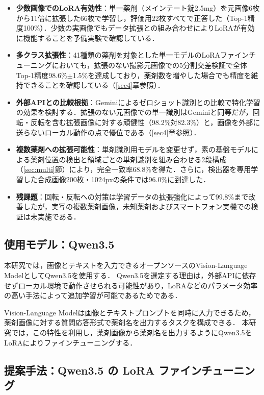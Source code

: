 \documentclass[dvipdfmx]{jsarticle}
\begin{document}
\begin{itemize}
  \item \textbf{少数画像でのLoRA有効性}：単一薬剤（メインテート錠2.5mg）を元画像6枚から11倍に拡張した66枚で学習し，評価用22枚すべてで正答した（Top-1精度100\%）．少数の実画像でもデータ拡張との組み合わせによりLoRAが有効に機能することを予備実験で確認している．
  \item \textbf{多クラス拡張性}：41種類の薬剤を対象とした単一モデルのLoRAファインチューニングにおいても，拡張のない撮影元画像での5分割交差検証で全体Top-1精度98.6\%$\pm$1.5\%を達成しており，薬剤数を増やした場合でも精度を維持できることを確認している（\ref{sec4}章参照）．
  \item \textbf{外部APIとの比較根拠}：Geminiによるゼロショット識別との比較で特化学習の効果を検討する．拡張のない元画像での単一識別はGeminiと同等だが，回転・反転を含む拡張画像に対する頑健性（98.2\%対82.3\%）と，画像を外部に送らないローカル動作の点で優位である（\ref{sec4}章参照）．
  \item \textbf{複数薬剤への拡張可能性}：単剤識別用モデルを変更せず，素の基盤モデルによる薬剤位置の検出と領域ごとの単剤識別を組み合わせる2段構成（\ref{sec:multi}節）により，完全一致率68.8\%を得た．さらに，検出器を専用学習した合成画像200枚・1024pxの条件では96.0\%に到達した．
  \item \textbf{残課題}：回転・反転への対策は学習データの拡張強化によって99.8\%まで改善したが，実写の複数薬剤画像，未知薬剤およびスマートフォン実機での検証は未実施である．
\end{itemize}

\subsection{使用モデル：Qwen3.5}

本研究では，画像とテキストを入力できるオープンソースのVision-Language ModelとしてQwen3.5を使用する．
Qwen3.5を選定する理由は，外部APIに依存せずローカル環境で動作させられる可能性があり，LoRAなどのパラメータ効率の高い手法によって追加学習が可能であるためである．

Vision-Language Modelは画像とテキストプロンプトを同時に入力できるため，薬剤画像に対する質問応答形式で薬剤名を出力するタスクを構成できる．
本研究では，この特性を利用し，薬剤画像から薬剤名を出力するようにQwen3.5をLoRAによりファインチューニングする．

\subsection{提案手法：Qwen3.5 の LoRA ファインチューニング}\label{sec:proposed}
\end{document}
